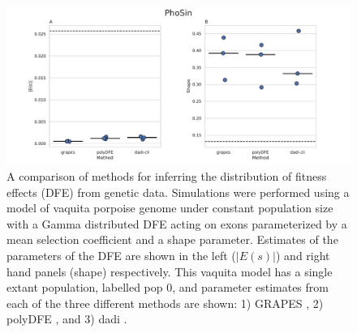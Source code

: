 \documentclass[hidelinks]{article}
\begin{document}
\begin{figure}
    \centering
    \includegraphics[width=\textwidth]{figures/PhoSin/Constant/PhoSin_Constant_Gamma_R22_Phocoena_sinus.mPhoSin1.pri.110_exons_DFE_plot.pdf}
    \caption{
    \label{fig:vaquita-dfe.constant}
    A comparison of methods for inferring the distribution of fitness effects (DFE) from genetic data.
    Simulations were performed using a model of vaquita porpoise genome under constant population size with a Gamma distributed DFE
    acting on exons parameterized by a mean selection coefficient and a shape parameter. Estimates of the 
    parameters of the DFE are shown in the left ($\lvert E(s) \rvert $) and right hand panels (shape) respectively.
    This vaquita model has a single extant population, labelled pop 0, and parameter estimates from each
    of the three different methods are shown: 1) GRAPES \cite{galtier2016adaptive}, 2) polyDFE \citep{tataru2020polydfe},
    and 3) dadi \citep{gutenkunst2009inferring}.}
\end{figure}
\end{document}
